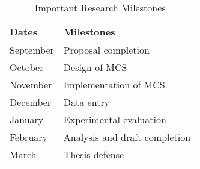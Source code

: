 \begin{table}[ht]
  \begin{center}
    \begin{tabular} {|p{1.5in}|p{3.0in}|} \hline
      {\bf Dates } & {\bf Milestones}\\ \hline

      September & Proposal completion \\ \hline

      October & Design of MCS \\ \hline

      November & Implementation of MCS \\ \hline

      December & Data entry \\ \hline

      January & Experimental evaluation \\ \hline

      February & Analysis and draft completion \\ \hline

      March & Thesis defense \\ \hline
    \end{tabular}
    \caption{Important Research Milestones}
    \label{tab:milestones}
  \end{center}
\end{table}
